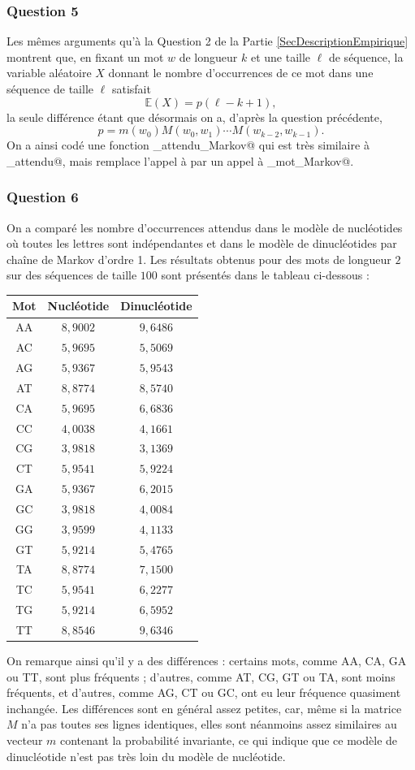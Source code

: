 \documentclass[a4paper,12pt]{article}
\begin{document}
\subsubsection*{Question 5}

Les mêmes arguments qu'à la Question 2 de la Partie \ref{SecDescriptionEmpirique} montrent que, en fixant un mot $w$ de longueur $k$ et une taille $\ell$ de séquence, la variable aléatoire $X$ donnant le nombre d'occurrences de ce mot dans une séquence de taille $\ell$ satisfait
\[
\mathbb E(X) = p (\ell - k + 1),
\]
la seule différence étant que désormais on a, d'après la question précédente,
\[
p = m(w_0) M(w_0, w_1) \dotsm M(w_{k-2}, w_{k-1}).
\]
On a ainsi codé une fonction \verb@comptage_attendu_Markov@ qui est très similaire à \verb@comptage_attendu@, mais remplace l'appel à \verb@logproba@ par un appel à \verb@logproba_mot_Markov@.

\subsubsection*{Question 6}

On a comparé les nombre d'occurrences attendus dans le modèle de nucléotides où toutes les lettres sont indépendantes et dans le modèle de dinucléotides par chaîne de Markov d'ordre 1. Les résultats obtenus pour des mots de longueur $2$ sur des séquences de taille $100$ sont présentés dans le tableau ci-dessous :

\begin{center}
\begin{tabular}{ccc}
Mot & Nucléotide & Dinucléotide \tabularnewline
\hline
AA & $8,9002$ & $9,6486$ \tabularnewline
AC & $5,9695$ & $5,5069$ \tabularnewline
AG & $5,9367$ & $5,9543$ \tabularnewline
AT & $8,8774$ & $8,5740$ \tabularnewline
CA & $5,9695$ & $6,6836$ \tabularnewline
CC & $4,0038$ & $4,1661$ \tabularnewline
CG & $3,9818$ & $3,1369$ \tabularnewline
CT & $5,9541$ & $5,9224$ \tabularnewline
GA & $5,9367$ & $6,2015$ \tabularnewline
GC & $3,9818$ & $4,0084$ \tabularnewline
GG & $3,9599$ & $4,1133$ \tabularnewline
GT & $5,9214$ & $5,4765$ \tabularnewline
TA & $8,8774$ & $7,1500$ \tabularnewline
TC & $5,9541$ & $6,2277$ \tabularnewline
TG & $5,9214$ & $6,5952$ \tabularnewline
TT & $8,8546$ & $9,6346$ \tabularnewline
\end{tabular}
\end{center}

On remarque ainsi qu'il y a des différences : certains mots, comme AA, CA, GA ou TT, sont plus fréquents ; d'autres, comme AT, CG, GT ou TA, sont moins fréquents, et d'autres, comme AG, CT ou GC, ont eu leur fréquence quasiment inchangée. Les différences sont en général assez petites, car, même si la matrice $M$ n'a pas toutes ses lignes identiques, elles sont néanmoins assez similaires au vecteur $m$ contenant la probabilité invariante, ce qui indique que ce modèle de dinucléotide n'est pas très loin du modèle de nucléotide.
\end{document}
